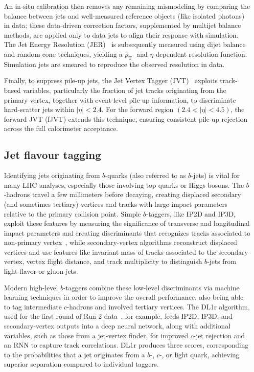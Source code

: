 An in-situ calibration then removes any remaining mismodeling by comparing the balance between jets and well-measured reference objects (like isolated photons) in data; these data-driven correction factors, supplemented by multijet balance methods, are applied only to data jets to align their response with simulation. The Jet Energy Resolution (JER)~\cite{Aaboud_2017} is subsequently measured using dijet balance and random-cone techniques, yielding a $p_{\text{T}}$- and $\eta$-dependent resolution function. Simulation jets are smeared to reproduce the observed resolution in data.

Finally, to suppress pile-up jets, the Jet Vertex Tagger (JVT)~\cite{ATL-PHYS-PUB-2014-001} exploits track-based variables, particularly the fraction of jet tracks originating from the primary vertex, together with event-level pile-up information, to discriminate hard-scatter jets within $|\eta|<2.4$. For the forward region $(2.4<|\eta|<4.5)$, the forward JVT (fJVT) extends this technique, ensuring consistent pile-up rejection across the full calorimeter acceptance. 

\subsection*{Jet flavour tagging} 
Identifying jets originating from $b$-quarks (also referred to as $b$-jets) is vital for many LHC analyses, especially those involving top quarks or Higgs bosons. The $b$-hadrons travel a few millimeters before decaying, creating displaced secondary (and sometimes tertiary) vertices and tracks with large impact parameters relative to the primary collision point.
Simple $b$-taggers, like IP2D and IP3D, exploit these features by measuring the significance of transverse and longitudinal impact parameters and creating discriminants that recognizes tracks associated to non-primary vertex~\cite{btag_1,btag_2}, while secondary-vertex algorithms reconstruct displaced vertices and use features like invariant mass of tracks associated to the secondary vertex, vertex flight distance, and track multiplicity to distinguish $b$-jets from light-flavor or gluon jets.

Modern high-level $b$-taggers combine these low-level discriminants via machine learning techniques in order to improve the overall performance, also being able to tag intermediate $c$-hadrons and involved tertiary vertices. The DL1r algorithm, used for the first round of Run-2 data~\cite{tagging}, for example, feeds IP2D, IP3D, and secondary-vertex outputs into a deep neural network, along with additional variables, such as those from a jet-vertex finder, for improved $c$-jet rejection and an RNN to capture track correlations. DL1r produces three scores, corresponding to the probabilities that a jet originates from a $b$-, $c$-, or light quark, achieving superior separation compared to individual taggers.

